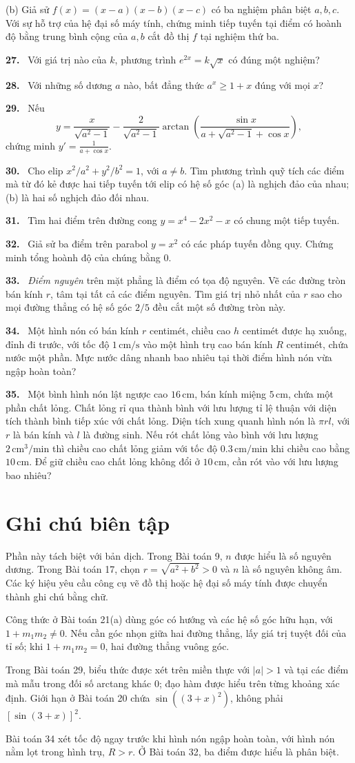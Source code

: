 \documentclass[12pt,a4paper]{article}
\newcommand{\bt}[1]{\par\smallskip\Needspace{5\baselineskip}\noindent\textbf{#1.}\ }
\begin{document}
(b) Giả sử $f(x)=(x-a)(x-b)(x-c)$ có ba nghiệm phân biệt $a,b,c$. Với sự hỗ trợ của hệ đại số máy tính, chứng minh tiếp tuyến tại điểm có hoành độ bằng trung bình cộng của $a,b$ cắt đồ thị $f$ tại nghiệm thứ ba.
\bt{27} Với giá trị nào của $k$, phương trình $e^{2x}=k\sqrt{x}$ có đúng một nghiệm?
\bt{28} Với những số dương $a$ nào, bất đẳng thức $a^x\ge1+x$ đúng với mọi $x$?
\bt{29} Nếu
\[y=\frac{x}{\sqrt{a^2-1}}-\frac2{\sqrt{a^2-1}}\arctan\left(\frac{\sin x}{a+\sqrt{a^2-1}+\cos x}\right),\]
chứng minh $\displaystyle y'=\frac1{a+\cos x}$.
\bt{30} Cho elip $x^2/a^2+y^2/b^2=1$, với $a\ne b$. Tìm phương trình quỹ tích các điểm mà từ đó kẻ được hai tiếp tuyến tới elip có hệ số góc (a) là nghịch đảo của nhau; (b) là hai số nghịch đảo đối nhau.
\bt{31} Tìm hai điểm trên đường cong $y=x^4-2x^2-x$ có chung một tiếp tuyến.
\bt{32} Giả sử ba điểm trên parabol $y=x^2$ có các pháp tuyến đồng quy. Chứng minh tổng hoành độ của chúng bằng $0$.
\bt{33} \textit{Điểm nguyên} trên mặt phẳng là điểm có tọa độ nguyên. Vẽ các đường tròn bán kính $r$, tâm tại tất cả các điểm nguyên. Tìm giá trị nhỏ nhất của $r$ sao cho mọi đường thẳng có hệ số góc $2/5$ đều cắt một số đường tròn này.
\bt{34} Một hình nón có bán kính $r$ centimét, chiều cao $h$ centimét được hạ xuống, đỉnh đi trước, với tốc độ $1\,\mathrm{cm/s}$ vào một hình trụ cao bán kính $R$ centimét, chứa nước một phần. Mực nước dâng nhanh bao nhiêu tại thời điểm hình nón vừa ngập hoàn toàn?
\bt{35} Một bình hình nón lật ngược cao $16\,\mathrm{cm}$, bán kính miệng $5\,\mathrm{cm}$, chứa một phần chất lỏng. Chất lỏng rỉ qua thành bình với lưu lượng tỉ lệ thuận với diện tích thành bình tiếp xúc với chất lỏng. Diện tích xung quanh hình nón là $\pi rl$, với $r$ là bán kính và $l$ là đường sinh. Nếu rót chất lỏng vào bình với lưu lượng $2\,\mathrm{cm^3/min}$ thì chiều cao chất lỏng giảm với tốc độ $0.3\,\mathrm{cm/min}$ khi chiều cao bằng $10\,\mathrm{cm}$. Để giữ chiều cao chất lỏng không đổi ở $10\,\mathrm{cm}$, cần rót vào với lưu lượng bao nhiêu?

\clearpage
\section*{Ghi chú biên tập}
Phần này tách biệt với bản dịch. Trong Bài toán 9, $n$ được hiểu là số nguyên dương. Trong Bài toán 17, chọn $r=\sqrt{a^2+b^2}>0$ và $n$ là số nguyên không âm. Các ký hiệu yêu cầu công cụ vẽ đồ thị hoặc hệ đại số máy tính được chuyển thành ghi chú bằng chữ.

Công thức ở Bài toán 21(a) dùng góc có hướng và các hệ số góc hữu hạn, với $1+m_1m_2\ne0$. Nếu cần góc nhọn giữa hai đường thẳng, lấy giá trị tuyệt đối của tỉ số; khi $1+m_1m_2=0$, hai đường thẳng vuông góc.

Trong Bài toán 29, biểu thức được xét trên miền thực với $|a|>1$ và tại các điểm mà mẫu trong đối số arctang khác $0$; đạo hàm được hiểu trên từng khoảng xác định. Giới hạn ở Bài toán 20 chứa $\sin((3+x)^2)$, không phải $[\sin(3+x)]^2$.

Bài toán 34 xét tốc độ ngay trước khi hình nón ngập hoàn toàn, với hình nón nằm lọt trong hình trụ, $R>r$. Ở Bài toán 32, ba điểm được hiểu là phân biệt.
\end{document}
